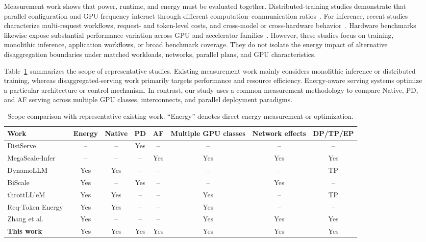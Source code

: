 Measurement work shows that power, runtime, and energy must be evaluated together. Distributed-training studies demonstrate that parallel configuration and GPU frequency interact through different computation--communication ratios~\cite{zhang2026distributedenergy}. For inference, recent studies characterize multi-request workflows, request- and token-level costs, and cross-model or cross-hardware behavior~\cite{ifath2026characterizing,vellaisamy2026characterization,chung2025mlenergy}. Hardware benchmarks likewise expose substantial performance variation across GPU and accelerator families~\cite{agrawal2024vidur}. However, these studies focus on training, monolithic inference, application workflows, or broad benchmark coverage. They do not isolate the energy impact of alternative disaggregation boundaries under matched workloads, networks, parallel plans, and GPU characteristics.

Table~\ref{tab:related-comparison} summarizes the scope of representative studies. Existing measurement work mainly considers monolithic inference or distributed training, whereas disaggregated-serving work primarily targets performance and resource efficiency. Energy-aware serving systems optimize a particular architecture or control mechanism. In contrast, our study uses a common measurement methodology to compare Native, PD, and AF serving across multiple GPU classes, interconnects, and parallel deployment paradigms.

\begin{table}[t]
  \caption{Scope comparison with representative existing work. ``Energy'' denotes direct energy measurement or optimization.}
  \label{tab:related-comparison}
  \centering
  \small
  \setlength{\tabcolsep}{4pt}
  \begin{tabular}{lccccccc}
    \toprule
    Work & Energy & Native & PD & AF & Multiple GPU classes & Network effects & DP/TP/EP \\
    \midrule
    DistServe~\cite{zhong2024distserve} & -- & -- & Yes & -- & -- & -- & -- \\
    MegaScale-Infer~\cite{zhu2025megascale} & -- & -- & -- & Yes & Yes & Yes & Yes \\
    DynamoLLM~\cite{stojkovic2025dynamollm} & Yes & Yes & -- & -- & -- & -- & TP \\
    BiScale~\cite{basit2026biscale} & Yes & -- & Yes & -- & -- & Yes & -- \\
    throttLL'eM~\cite{kakolyris2025throttll} & Yes & Yes & -- & -- & Yes & -- & TP \\
    Req-Token Energy~\cite{vellaisamy2026characterization} & Yes & Yes & -- & -- & Yes & -- & -- \\
    Zhang et al.~\cite{zhang2026distributedenergy} & Yes & -- & -- & -- & Yes & Yes & Yes \\
    \textbf{This work} & Yes & Yes & Yes & Yes & Yes & Yes & Yes \\
    \bottomrule
  \end{tabular}
\end{table}

